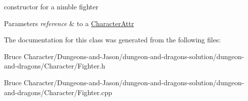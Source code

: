 constructor for a nimble fighter 
\begin{DoxyParams}{Parameters}
{\em reference} & to a \hyperlink{class_character_attr}{Character\+Attr} \\
\hline
\end{DoxyParams}


The documentation for this class was generated from the following files\+:\begin{DoxyCompactItemize}
\item 
Bruce Character/\+Dungeons-\/and-\/\+Jason/dungeon-\/and-\/dragons-\/solution/dungeon-\/and-\/dragons/\+Character/Fighter.\+h\item 
Bruce Character/\+Dungeons-\/and-\/\+Jason/dungeon-\/and-\/dragons-\/solution/dungeon-\/and-\/dragons/\+Character/Fighter.\+cpp\end{DoxyCompactItemize}
